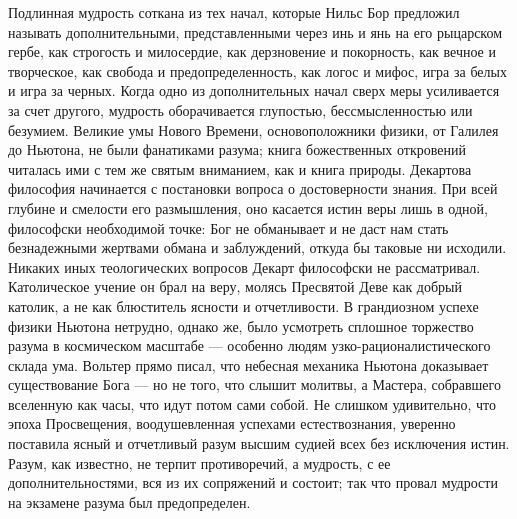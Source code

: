 \begin{multicols}{3}
Подлинная мудрость соткана из тех начал, которые Нильс Бор предложил называть
дополнительными, представленными через инь и янь на его рыцарском гербе, как
строгость и милосердие, как дерзновение и покорность, как вечное и творческое,
как свобода и предопределенность, как логос и мифос, игра за белых и игра за
черных. Когда одно из дополнительных начал сверх меры усиливается за счет
другого, мудрость оборачивается глупостью, бессмысленностью или безумием.
Великие умы Нового Времени, основоположники физики, от Галилея до Ньютона, не
были фанатиками разума; книга божественных откровений читалась ими с тем же
святым вниманием, как и книга природы. Декартова философия начинается с
постановки вопроса о достоверности знания. При всей глубине и смелости его
размышления, оно касается истин веры лишь в одной, философски необходимой
точке: Бог не обманывает и не даст нам стать безнадежными жертвами обмана и
заблуждений, откуда бы таковые ни исходили. Никаких иных теологических вопросов
Декарт философски не рассматривал. Католическое учение он брал на веру, молясь
Пресвятой Деве как добрый католик, а не как блюститель ясности и отчетливости.
В грандиозном успехе физики Ньютона нетрудно, однако же, было усмотреть
сплошное торжество разума в космическом масштабе — особенно людям
узко-рационалистического склада ума. Вольтер прямо писал, что небесная механика
Ньютона доказывает существование Бога — но не того, что слышит молитвы, а
Мастера, собравшего вселенную как часы, что идут потом сами собой. Не слишком
удивительно, что эпоха Просвещения, воодушевленная успехами естествознания,
уверенно поставила ясный и отчетливый разум высшим судией всех без исключения
истин. Разум, как известно, не терпит противоречий, а мудрость, с ее
дополнительностями, вся из их сопряжений и состоит; так что провал мудрости на
экзамене разума был предопределен.



\end{multicols}
